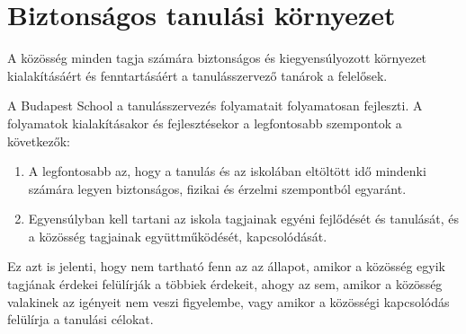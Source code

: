 \hypertarget{biztonsagos-tanulasi-kornyezet}{%
\section{Biztonságos tanulási
környezet}\label{biztonsagos-tanulasi-kornyezet}}

A közösség minden tagja számára biztonságos és kiegyensúlyozott
környezet kialakításáért és fenntartásáért a tanulásszervező tanárok a
felelősek.

A Budapest School a tanulásszervezés folyamatait folyamatosan fejleszti.
A folyamatok kialakításakor és fejlesztésekor a legfontosabb szempontok
a következők:

\begin{enumerate}
\def\labelenumi{\arabic{enumi}.}
\item
  A legfontosabb az, hogy a tanulás és az iskolában eltöltött idő mindenki
  számára legyen biztonságos, fizikai és érzelmi szempontból egyaránt.
\item
  Egyensúlyban kell tartani az iskola tagjainak egyéni fejlődését és
  tanulását, és a közösség tagjainak együttműködését, kapcsolódását.
\end{enumerate}

Ez azt is jelenti, hogy nem tartható fenn az az állapot, amikor a
közösség egyik tagjának érdekei felülírják a többiek érdekeit, ahogy az
sem, amikor a közösség valakinek az igényeit nem veszi figyelembe, vagy
amikor a közösségi kapcsolódás felülírja a tanulási célokat.
